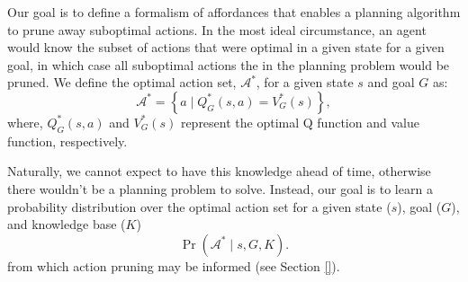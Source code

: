 \documentclass[conference]{IEEEtran}
\begin{document}
Our goal is to define a formalism of affordances that enables a planning algorithm to prune away suboptimal actions. In the most ideal circumstance, an agent would know the subset of actions that were optimal in a given state for a given goal, in which case all suboptimal actions the in the planning problem would be pruned. We define the optimal action set, $\mathcal{A}^*$,
for a given state $s$ and goal $G$ as:
\begin{equation}
\mathcal{A}^* = \left\{ a \mid Q^*_G(s,a) = V^*_G(s) \right\}, 
\label{eq:opt_act_set}
\end{equation}
where, $Q^*_G(s,a)$ and $V^*_G(s)$ represent the optimal Q function and 
value function, respectively. 

Naturally, we cannot expect to have this knowledge ahead of time, otherwise there wouldn't be a planning problem to solve. Instead, our goal is to learn a probability distribution over the optimal action set for a given state ($s$), goal ($G$), and knowledge base ($K$)
\begin{equation}
\Pr(\mathcal{A}^* \mid s, G, K).
\label{eq:master}
\end{equation}
from which action pruning may be informed (see Section \ref{}).
\end{document}
